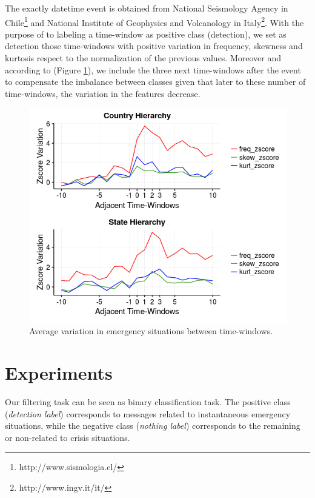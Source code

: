 \documentclass[sigconf]{acmart}
\begin{document}
The exactly datetime event is obtained from National Seismology Agency in Chile\footnote{http://www.sismologia.cl/} and 
National Institute of Geophysics and Volcanology in Italy\footnote{http://www.ingv.it/it/}. With the purpose of to labeling a time-window as positive class (detection), we set as detection those time-windows with positive variation in frequency, skewness and kurtosis respect to the normalization of the previous values. Moreover and according to (Figure \ref{fig:labeled}), we include the three next time-windows after the event to compensate the imbalance between classes given that later to these number of time-windows, the variation in the features decrease.


\begin{figure}
	\centering
	\includegraphics[width=\columnwidth]{img/labeled2.png}
	\caption{Average variation in emergency situations between time-windows.}
	\label{fig:labeled}
\end{figure}



\section{Experiments}

Our filtering task can be seen as binary classification task. The positive class (\textit{detection label}) corresponds to messages related to instantaneous emergency situations, while the negative class (\textit{nothing label}) corresponds to the remaining or non-related to crisis situations.
\end{document}
